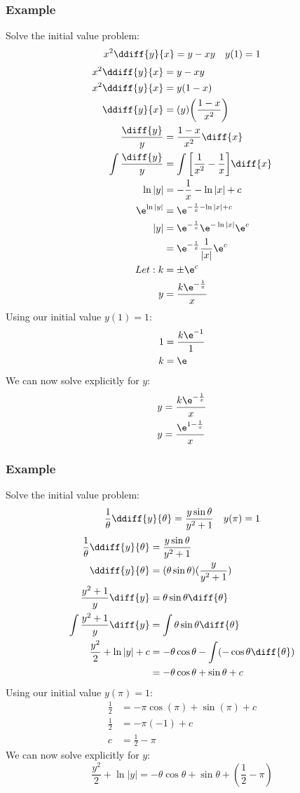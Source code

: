 \documentclass{math}
\begin{document}
\subsubsection*{Example}
Solve the initial value problem:
\[ x^2\ddiff{y}{x} = y-xy \quad y(1) = 1 \]
\begin{align*}
  x^2\ddiff{y}{x} &= y-xy \\
  x^2\ddiff{y}{x} &= y(1-x) \\
  \ddiff{y}{x} &= (y)\bigg(\frac{1-x}{x^2}\bigg) \\
  \frac{\diff{y}}{y} &= \frac{1-x}{x^2}\diff{x} \\
  \int\frac{\diff{y}}{y} &= \int\bigg[\frac{1}{x^2}-\frac{1}{x}\bigg]\diff{x} \\
  \ln|y| &= -\frac{1}{x}-\ln|x|+c \\
  \e^{\ln|y|} &= \e^{-\frac{1}{x}-\ln|x|+c} \\
  |y| &= \e^{-\frac{1}{x}}\e^{-\ln|x|}\e^c \\
  &= \e^{-\frac{1}{x}}\frac{1}{|x|}\e^c \\
  Let: k &= \pm\e^c \\
  y &= \frac{k\e^{-\frac{1}{x}}}{x}
\end{align*}
Using our initial value \( y(1) = 1 \):
\begin{align*}
  1 &= \frac{k\e^{-1}}{1} \\
  k &= \e
\end{align*}
We can now solve explicitly for \( y \):
\begin{align*}
  y &= \frac{k\e^{-\frac{1}{x}}}{x} \\
  y &= \frac{\e^{1-\frac{1}{x}}}{x}
\end{align*}

\subsubsection*{Example}
Solve the initial value problem:
\[ \frac{1}{\theta}\ddiff{y}{\theta} = \frac{y\sin\theta}{y^2+1} \quad
  y(\pi) = 1 \]
\begin{align*}
  \frac{1}{\theta}\ddiff{y}{\theta} &= \frac{y\sin\theta}{y^2+1} \\
  \ddiff{y}{\theta} &= (\theta\sin\theta)(\frac{y}{y^2+1}) \\
  \frac{y^2+1}{y}\diff{y} &= \theta\sin\theta\diff{\theta} \\
  \int\frac{y^2+1}{y}\diff{y} &= \int\theta\sin\theta\diff{\theta} \\
  \frac{y^2}{2}+\ln|y|+c &= -\theta\cos\theta-\int(-\cos\theta\diff{\theta}) \\
  &= -\theta\cos\theta+\sin\theta+c
\end{align*}
Using our initial value \( y(\pi) = 1 \):
\begin{align*}
  \frac{1}{2} &= -\pi\cos(\pi)+\sin(\pi)+c \\
  \frac{1}{2} &= -\pi(-1)+c \\
  c &= \frac{1}{2}-\pi
\end{align*}
We can now solve explicitly for \( y \):
\[ \frac{y^2}{2}+\ln|y| = -\theta\cos\theta+\sin\theta+(\frac{1}{2}-\pi) \]
\end{document}
